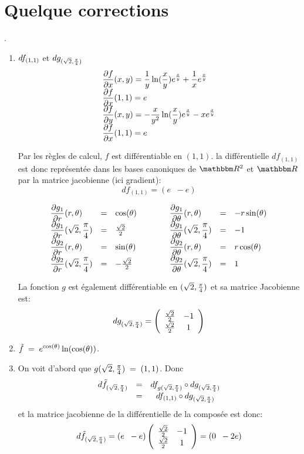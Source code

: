 
					\section{Quelque corrections}



.
\begin{enumerate}
\item $\dst{df_{(1,1)}}$ et $\dst{dg_{(\sqrt2,\frac{\pi}{4})}}$\\
\[\ba{l}\dst{\dfdx(x,y) = \f{1}{y}\ln(\f{x}{y})e^{\f{x}{y}}+\f{1}{x}e^{\f{x}{y}}}\\
            \dst{\dfdx(1,1)=e}\\
            \dst{\dfdy(x,y)=-\f{x}{y^2}\ln(\f{x}{y})e^{\f{x}{y}}-xe^{\f{x}{y}}}\\
            \dst{\dfdx(1,1)=e}\ea\]
            
 \noindent Par les règles de calcul, $f$ est différentiable en $(1,1)$. la différentielle $df_{(1,1)}$ est donc représentée dans les bases canoniques de $\eR^2$ et $\eR$ par la matrice jacobienne (ici gradient):\[df_{(1,1)}=(e \;\; -e)\]
 
\[\ba{lclllllcl}\dst{\dgudr(r,\theta)} &=&\cos(\theta)& & & & \dst{\dgudth(r,\theta)}   & =&-r\sin(\theta)\\
            \dst{\dgudr(\sqrt2, \f{\pi}{4})}&=&\f{\sqrt2}{2}& & &&\dst{\dgudth(\sqrt2, \f{\pi}{4})}& =&-1 \\
            \dst{\dgddr(r,\theta)} &=&\sin(\theta)&  && &\dst{\dgddth(r,\theta)}  &=&r\cos(\theta) \\
            \dst{\dgddr(\sqrt2, \f{\pi}{4})}&=&-\f{\sqrt2}{2}&& & &\dst{\dgddth(\sqrt2, \f{\pi}{4})}& = &1\ea\]

La fonction $g$ est également différentiable en $(\sqrt2, \f{\pi}{4})$ et sa matrice Jacobienne est:
\[dg_{(\sqrt2, \f{\pi}{4})}=\left(\ba{cc} \f{\sqrt2}{2} & -1\\
							\f{\sqrt2}{2}&1\ea\right)\]	


\item $\dst{\tilde{f} \;=\;e^{\cos(\theta)}\ln(\cos(\theta))}$.
\item On voit d'abord que $g(\sqrt2, \f{\pi}{4})\;=\;(1,1)$. Donc
\[\ba{cccc} d\tilde{f}_{(\sqrt2, \f{\pi}{4})} & = & df_{g(\sqrt2, \f{\pi}{4})}\circ dg_{(\sqrt2, \f{\pi}{4})}\\
							    & =& df_{(1,1)}\circ dg_{(\sqrt2, \f{\pi}{4})} \ea\]
et  la matrice jacobienne de la différentielle de la composée est donc:\[d\tilde{f}_{(\sqrt2, \f{\pi}{4})}=(e\;\;-e)\left(\ba{cc} \f{\sqrt2}{2} & -1\\
							\f{\sqrt2}{2}&1\ea\right)=(0\;\;-2e)\]

							    		

\end{enumerate}


